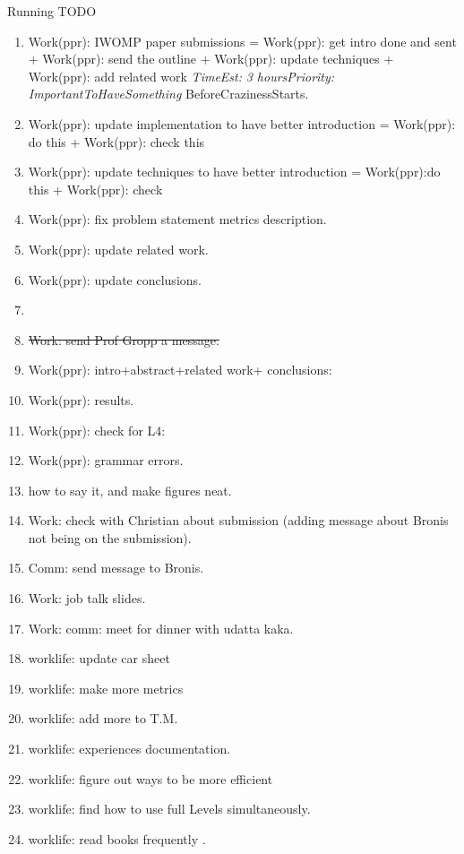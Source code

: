 \documentclass[serif, mathserif, final]{beamer}
\newcommand{\doneTask}[1]{\tiny \item \tiny \sout{#1}}
\newcommand{\te}[1]{\textit{TimeEst:} \textit{#1}}
\newcommand{\prio}[1]{\textit{Priority:} \textit{#1}}
\newcommand{\dl}[1]{#1}
\begin{document}
\begin{frame}{}
\begin{columns}
\begin{column}{0.50\linewidth}
      \begin{block}{Running TODO} %
        \begin{enumerate}
          \small \item \small Work(ppr): IWOMP paper submissions  =  Work(ppr): get
          intro done and sent  + Work(ppr): send the outline + 
          Work(ppr): update techniques + Work(ppr): add related work \te{3
            hours}\prio{ImportantToHaveSomething}
          \dl{BeforeCrazinessStarts}. 
        \item \small Work(ppr): update implementation to have better
          introduction  = Work(ppr): do this + Work(ppr): check this 
        \item \small Work(ppr): update techniques to have better
          introduction = Work(ppr):do this  +  Work(ppr): check 
        \item \small  Work(ppr): fix problem statement metrics
          description. 
        \item \small Work(ppr): update related work. 
        \item \small Work(ppr): update conclusions. 
        \item \small \doneTask{Work: send Prof Gropp a message.}           
        \item \small Work(ppr): intro+abstract+related work+ conclusions: 
        \item \small Work(ppr): results. 
        \item \small Work(ppr): check for L4: 
        \item \small Work(ppr): grammar errors. 
        \item \small how to say it, and make figures neat. 
        \item \small Work: check with Christian about submission (adding
          message about Bronis not being on the submission). 
        \item \small Comm: send message to Bronis. 

        \item \small Work: job talk slides. 
        \item \small Work: comm: meet for dinner with udatta kaka. 
          
        \item \small worklife: update car sheet 
        \item \small worklife: make more metrics 
        \item \small worklife: add more to T.M. 
        \item \small worklife: experiences documentation.  
        \item \small worklife: figure out ways to be more efficient
        \item \small worklife: find how to use full Levels
      simultaneously.
    \item \small worklife: read books frequently . 
      

\end{enumerate}
\end{block}
\end{column}
\end{columns}
\end{frame}
\end{document}

